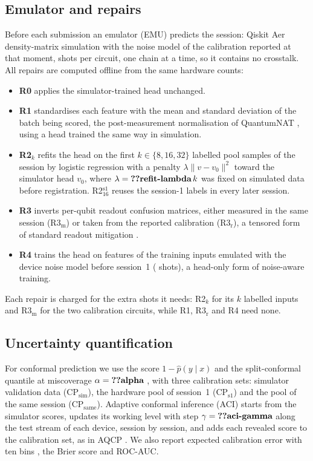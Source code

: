 \subsection{Emulator and repairs}
Before each submission an emulator (EMU) predicts the session: Qiskit Aer density-matrix
simulation with the noise model of the calibration reported at that moment, 
shots per circuit, one chain at a time, so it contains no crosstalk. All repairs are computed
offline from the same hardware counts:
\begin{itemize}
\item \textbf{R0} applies the simulator-trained head unchanged.
\item \textbf{R1} standardises each feature with the mean and standard deviation of the batch
being scored, the post-measurement normalisation of QuantumNAT \cite{wang2022quantumnat}, using
a head trained the same way in simulation.
\item \textbf{R2$_k$} refits the head on the first $k\in\{8,16,32\}$ labelled pool samples of the
session by logistic regression with a penalty $\lambda\lVert v-v_0\rVert^2$ toward the
simulator head $v_0$, where $\lambda=\val{refit-lambda}\,k$ was fixed on simulated data before
registration. R2$_{16}^{\mathrm{s1}}$ reuses the session-1 labels in every later session.
\item \textbf{R3} inverts per-qubit readout confusion matrices, either measured in the same
session (R3$_\mathrm{m}$) or taken from the reported calibration (R3$_\mathrm{r}$), a tensored
form of standard readout mitigation \cite{nation2021m3}.
\item \textbf{R4} trains the head on features of the training inputs emulated with the device
noise model before session~1 ( shots), a head-only form of noise-aware
training.
\end{itemize}
Each repair is charged for the extra shots it needs: R2$_k$ for its $k$ labelled inputs and
R3$_\mathrm{m}$ for the two calibration circuits, while R1, R3$_\mathrm{r}$ and R4 need none.

\subsection{Uncertainty quantification}
For conformal prediction we use the score $1-\hat p(y\mid x)$ and the split-conformal quantile
at miscoverage $\alpha=\val{alpha}$ \cite{park2023qcp}, with three calibration sets: simulator
validation data (CP$_\mathrm{sim}$), the hardware pool of session~1 (CP$_\mathrm{s1}$) and the
pool of the same session (CP$_\mathrm{same}$). Adaptive conformal inference (ACI)
\cite{gibbs2021aci} starts from the simulator scores, updates its working level with step
$\gamma=\val{aci-gamma}$ along the test stream of each device, session by session, and adds each revealed
score to the calibration set, as in AQCP \cite{spencer2026aqcp}. We also report expected
calibration error with ten bins \cite{guo2017calibration}, the Brier score and ROC-AUC.

